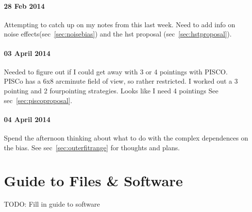 \documentclass[11pt]{article}
\begin{document}
\paragraph{28 Feb 2014}
Attempting to catch up on my notes from this last week. Need to add info on noise effects(sec~\ref{sec:noisebias}) and the hst proposal (sec~\ref{sec:hstproposal}).


\paragraph{03 April 2014}
Needed to figure out if I could get away with 3 or 4 pointings with PISCO. PISCo has a 6x8 arcminute field of view, so rather restricted. I worked out a 3 pointing and 2 fourpointing strategies. Looks like I need 4 pointings See sec~\ref{sec:piscoproposal}.

\paragraph{04 April 2014}
Spend the afternoon thinking about what to do with the complex dependences on the bias. See sec~\ref{sec:outerfitrange} for thoughts and plans.


\clearpage \newpage


\section{Guide to Files \& Software}

TODO: Fill in guide to software



\clearpage \newpage
\end{document}
